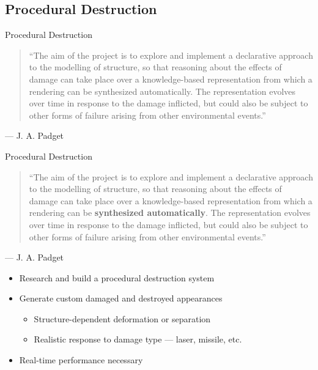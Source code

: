 \documentclass[t]{beamer}
\begin{document}
	\subsection{Procedural Destruction}
		\begin{frame}{Procedural Destruction}
		\begin{quote} \footnotesize
		``The aim of the project is to explore and implement a declarative approach to the modelling of structure, so that reasoning about the effects of damage can take place over a knowledge-based representation from which a rendering can be synthesized automatically.  The representation evolves over time in response to the damage inflicted, but could also be subject to other forms of failure arising from other environmental events.''
		\end{quote}
		\hfill --- J. A. Padget
		\end{frame}

		\begin{frame}[noframenumbering]{Procedural Destruction}
		\begin{quote} \footnotesize
		``The aim of the project is to explore and implement a declarative approach to the modelling of structure, so that reasoning about the effects of damage can take place over a knowledge-based representation from which a rendering can be \textbf{synthesized automatically}.  The representation evolves over time in response to the damage inflicted, but could also be subject to other forms of failure arising from other environmental events.''\end{quote}
		\hfill --- J. A. Padget
		\begin{itemize}
			\item Research and build a procedural destruction system
			\item Generate custom damaged and destroyed appearances
				\begin{itemize}
					\item Structure-dependent deformation or separation
					\item Realistic response to damage type --- laser, missile, etc.
				\end{itemize}
			\item Real-time performance necessary
		\end{itemize}
		\end{frame}
\end{document}
